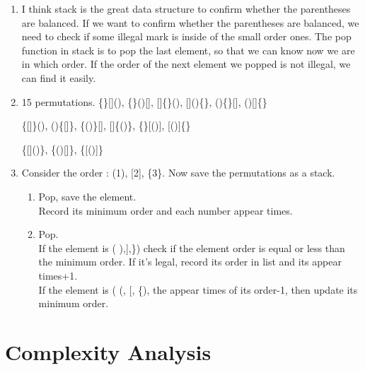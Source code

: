 \documentclass[12pt,a4paper]{article}
\begin{document}
\begin{enumerate}
    \item[(a)] 
        I think stack is the great data structure to confirm whether the parentheses are balanced.
        If we want to confirm whether the parentheses are balanced, we need to check if some illegal mark is inside of the small order ones. 
        The pop function in stack is to pop the last element, so that we can know now we are in which order. 
        If the order of the next element we popped is not illegal, we can find it easily.

    \item[(b)]
        15 permutations.
       \{\}[](), \{\}()[], []\{\}(), []()\{\}, ()\{\}[], ()[]\{\}

       \{[]\}(), ()\{[]\}, \{()\}[], []\{()\}, \{\}[()], [()]\{\}

       \{[]()\}, \{()[]\}, \{[()]\}

    \item[(c)]
        Consider the order : (1), [2], \{3\}. Now save the permutations as a stack.
        
        \begin{enumerate}
            \item[1.] Pop, save the element. \\
                Record its minimum order and each number appear times.
            \item[2.] Pop.\\ 
                If the element is ( ),],\}) check if the element order is equal or less than the minimum order. If it's legal, record its order in list and its appear times+1.\\
                If the element is ( (, [, \{), the appear times of its order-1, then update its minimum order.
        \end{enumerate}
\end{enumerate}

\section{Complexity Analysis}
\end{document}
